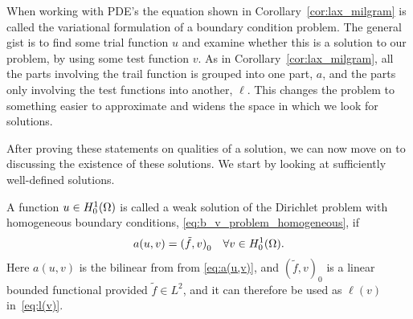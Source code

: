 When working with PDE's the equation shown in Corollary~\ref{cor:lax_milgram} 
is called the variational formulation of a boundary condition problem. 
The general gist is to find some trial function $u$ and examine whether this 
is a solution to our problem, by using some test function $v$. 
As in Corollary~\ref{cor:lax_milgram}, all the parts involving the trail function 
is grouped into one part, $a$, and the parts only involving the test functions into 
another, $\ell$.
This changes the problem to something easier to approximate and widens the 
space in which we look for solutions.

After proving these statements on qualities of a solution, we can now move 
on to discussing the existence of these solutions. We start by looking at 
sufficiently well-defined solutions. 
\begin{defn}{\quad}
    A function $u\in H_0^1(\Omega)$ is called a weak solution of 
    the Dirichlet problem with homogeneous boundary conditions,
    \eqref{eq:b_v_problem_homogeneous}, if 
     \begin{equation*}
        a(u,v) = {(\tilde{f},v)}_0 \quad \forall v \in H_0^1(\Omega).
     \end{equation*}
     Here $a(u,v)$ is the bilinear from from \eqref{eq:a(u,v)}, 
     and ${(\tilde{f},v)}_0$ is a linear bounded functional provided $\tilde{f}\in L^2$, and it can therefore be used as $\ell(v)$ in~\eqref{eq:l(v)}.
\end{defn}





